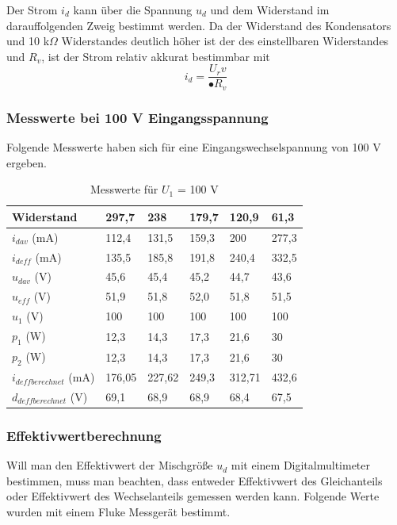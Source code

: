 \documentclass{article}
\begin{document}
Der Strom $i_d$ kann über die Spannung $u_d$ und dem Widerstand im darauffolgenden Zweig bestimmt werden. Da der Widerstand des Kondensators und 10 k$\Omega$ Widerstandes deutlich höher ist der des einstellbaren Widerstandes und $R_v$, ist der Strom relativ akkurat bestimmbar mit \[i_d = \frac{U_rv}{•R_v}\]

\newpage

\subsubsection{Messwerte bei 100 V Eingangsspannung}
Folgende Messwerte haben sich für eine Eingangswechselspannung von 100 V ergeben.

\begin{table}[H]
\centering
\begin{tabular}{|l||l|l|l|l|l|}
\hline
 Widerstand &297,7 &238 &179,7 &120,9 &61,3\\ \hline
 $i_{dav}$ (mA) &112,4 &131,5 &159,3 &200 &277,3\\ \hline
 $i_{deff}$ (mA) &135,5 &185,8 &191,8 &240,4 &332,5\\ \hline
 $u_{dav}$ (V) &45,6 &45,4 &45,2 &44,7 &43,6\\ \hline
 $u_{eff}$ (V) &51,9 &51,8 &52,0 &51,8 &51,5\\ \hline
 $u_{1}$ (V) &100 &100 &100 &100 &100\\ \hline
 $p_{1}$ (W) &12,3 &14,3 &17,3 &21,6 &30\\ \hline
 $p_{2}$ (W) &12,3 &14,3 &17,3 &21,6 &30\\ \hline
 
 $i_{deff berechnet}$ (mA) &176,05 &227,62 &249,3 &312,71 &432,6\\ \hline
 $d_{deff berechnet}$ (V) &69,1 &68,9 &68,9 &68,4 &67,5\\ \hline
\end{tabular}
\caption{Messwerte für $U_1$ = 100 V}
\end{table}

\subsubsection{Effektivwertberechnung}

Will man den Effektivwert der Mischgröße $u_d$ mit einem Digitalmultimeter bestimmen, muss man beachten, dass entweder Effektivwert des Gleichanteils oder Effektivwert des Wechselanteils gemessen werden kann. Folgende Werte wurden mit einem Fluke Messgerät bestimmt.
\end{document}
